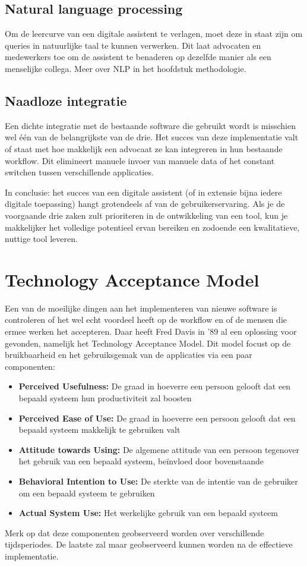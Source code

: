\subsection{Natural language processing}
Om de leercurve van een digitale assistent te verlagen, moet deze in staat zijn om queries in natuurlijke taal te kunnen verwerken.
Dit laat advocaten en medewerkers toe om de assistent te benaderen op dezelfde manier als een menselijke collega. Meer over NLP in het hoofdstuk methodologie.

\subsection{Naadloze integratie}
Een dichte integratie met de bestaande software die gebruikt wordt is misschien wel één van de belangrijkste van de drie. Het succes van deze implementatie valt of staat met hoe makkelijk
een advocaat ze kan integreren in hun bestaande workflow. Dit elimineert manuele invoer van manuele data of het constant switchen tussen verschillende applicaties.

In conclusie: het succes van een digitale assistent (of in extensie bijna iedere digitale toepassing) hangt grotendeels af van de gebruikerservaring.
Als je de voorgaande drie zaken zult prioriteren in de ontwikkeling van een tool, kun je makkelijker het volledige potentieel ervan bereiken en zodoende een kwalitatieve, nuttige tool leveren.

\section{Technology Acceptance Model}
Een van de moeilijke dingen aan het implementeren van nieuwe software is controleren of het wel echt voordeel heeft op de workflow en of de mensen die ermee werken het accepteren. 
Daar heeft Fred Davis in '89 al een oplossing voor gevonden, namelijk het Technology Acceptance Model. 
Dit model focust op de bruikbaarheid en het gebruiksgemak van de applicaties via een paar componenten:

\begin{itemize}
	\item \textbf{Perceived Usefulness:} De graad in hoeverre een persoon gelooft dat een bepaald systeem hun productiviteit zal boosten
	\item \textbf{Perceived Ease of Use:} De graad in hoeverre een persoon gelooft dat een bepaald systeem makkelijk te gebruiken valt
	\item \textbf{Attitude towards Using:} De algemene attitude van een persoon tegenover het gebruik van een bepaald systeem, beïnvloed door bovenstaande
	\item \textbf{Behavioral Intention to Use:} De sterkte van de intentie van de gebruiker om een bepaald systeem te gebruiken
	\item \textbf{Actual System Use:} Het werkelijke gebruik van een bepaald systeem
\end{itemize}

Merk op dat deze componenten geobserveerd worden over verschillende tijdsperiodes. De laatste zal maar geobserveerd kunnen worden na de effectieve implementatie. 

